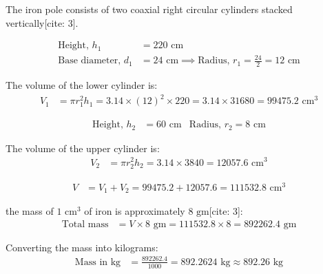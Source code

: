 \begin{enumerate}[label=\thesubsection.\arabic*, ref=\thesubsection.\theenumi]
	\solution
	The iron pole consists of two coaxial right circular cylinders stacked vertically[cite: 3].
	
	\begin{align*}
		\text{Height, } h_1 &= 220\text{ cm} \\
		\text{Base diameter, } d_1 &= 24\text{ cm} \implies \text{Radius, } r_1 = \frac{24}{2} = 12\text{ cm}
	\end{align*}
	
	The volume of the lower cylinder is:
	\begin{align*}
		V_1 &= \pi r_1^2 h_1 
		= 3.14 \times (12)^2 \times 220 
		= 3.14 \times 31680 
		= 99475.2\text{ cm}^3
	\end{align*}
	
	\begin{align*}
		\text{Height, } h_2 &= 60\text{ cm} &	\text{Radius, } r_2 = 8\text{ cm}
	\end{align*}
	
	The volume of the upper cylinder is:
	\begin{align*}
		V_2 &= \pi r_2^2 h_2 = 3.14 \times 3840 = 12057.6\text{ cm}^3
	\end{align*}
	
	\begin{align*}
		V &= V_1 + V_2 = 99475.2 + 12057.6 = 111532.8\text{ cm}^3
	\end{align*}
	
	
	 the mass of $1\text{ cm}^3$ of iron is approximately $8\text{ gm}$[cite: 3]:
	\begin{align*}
		\text{Total mass} &= V \times 8\text{ gm} = 111532.8 \times 8 = 892262.4\text{ gm}
	\end{align*}
	
	Converting the mass into kilograms:
	\begin{align*}
		\text{Mass in kg} &= \frac{892262.4}{1000} = 892.2624\text{ kg} \approx 892.26\text{ kg}
	\end{align*}
	
	
	
\end{enumerate}

